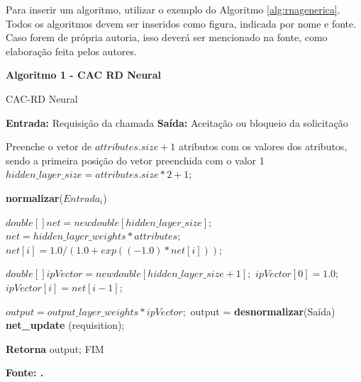 Para inserir um algoritmo, utilizar o exemplo do Algoritmo  \ref{alg:rnagenerica}.
Todos os algoritmos devem ser inseridos como figura, indicada por nome e  fonte. Caso 
forem de própria autoria, isso deverá ser mencionado na fonte, como elaboração feita pelos autores.

\begin{center}	
         \textbf{Algoritmo 1 -  CAC RD Neural}
	\vspace{-0.3cm}
\begin{minipage}[ht]{13cm}
\begin{algorithm}[H]
  \footnotesize
  \caption{CAC-RD Neural}
  \label{alg:rnagenerica}
  \begin{algorithmic}[1]
      \STATE \textbf{Entrada:} Requisição da chamada
    \STATE \textbf{Saída:} Aceitação ou bloqueio da solicitação
    
    \STATE Preenche o vetor de $attributes.size+1$ atributos com os valores dos atributos, sendo a primeira posição do vetor preenchida com o valor 1
		\STATE $hidden\_layer\_size =  attributes.size*2+1;$

    	\STATE \textbf{normalizar}($Entrada_i$)
    \ENDFOR

		\STATE $double [] net = new double [hidden\_layer\_size];$
    \STATE $net = hidden\_layer\_weights * attributes;$
			\STATE $net [i] = 1.0 / (1.0 + exp((-1.0)*net[i]));$
		\ENDFOR

		\STATE $double [] ipVector = new double [hidden\_layer\_size+1];$
    \STATE $ipVector [0] = 1.0;$
			\STATE $ipVector [i] = net [i-1];$
		\ENDFOR
		
		\STATE $output = output\_layer\_weights *  ipVector;$
    \STATE output = \textbf{desnormalizar}(Saída)
    \STATE \textbf{net\_update} (requisition);
    
    \STATE \textbf{Retorna} output; FIM
  \end{algorithmic}
\end{algorithm}

\small \centering \textbf{\footnotesize Fonte: \cite{mestrado}.}
\end{minipage}
\end{center}

